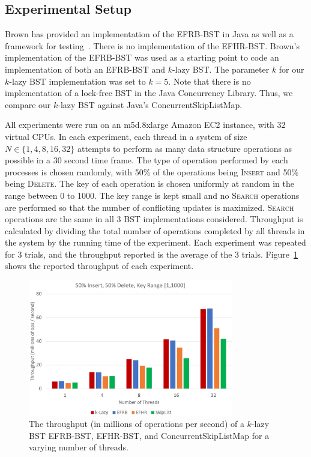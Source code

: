 \documentclass[letterpaper]{article}
\begin{document}
\subsection{Experimental Setup}
Brown has provided an implementation of the EFRB-BST in Java as well as a framework for testing~\cite{BrownImpl19}. There is no implementation of the EFHR-BST. Brown's implementation of the EFRB-BST was used as a starting point to code an implementation of both an EFRB-BST and $k$-lazy BST. The parameter $k$ for our $k$-lazy BST implementation was set to $k = 5$. Note that there is no implementation of a lock-free BST in the Java Concurrency Library. Thus, we compare our $k$-lazy BST against Java's ConcurrentSkipListMap.

All experiments were run on an m5d.8xlarge Amazon EC2 instance, with 32 virtual CPUs. In each experiment, each thread in a system of size $N \in  \{1, 4, 8, 16, 32\}$ attempts to perform as many data structure operations as possible in a 30 second time frame. The type of operation performed by each processes is chosen randomly, with 50\% of the operations being \textsc{Insert} and 50\% being \textsc{Delete}. The key of each operation is chosen uniformly at random in the range between 0 to 1000. The key range is kept small and no \textsc{Search} operations are performed so that the number of conflicting updates is maximized. \textsc{Search} operations are the same in all 3 BST implementations considered. Throughput is calculated by dividing the total number of operations completed by all threads in the system by the running time of the experiment. Each experiment was repeated for 3 trials, and the throughput reported is the average of the 3 trials. Figure~\ref{results} shows the reported throughput of each experiment.

\begin{figure}[!bt]
	\centering
	\includegraphics[width=0.80\textwidth]{results.png} 
	\caption{The throughput (in millions of operations per second) of a $k$-lazy BST EFRB-BST, EFHR-BST, and ConcurrentSkipListMap for a varying number of threads.}
	\label{results}
\end{figure}
\end{document}

